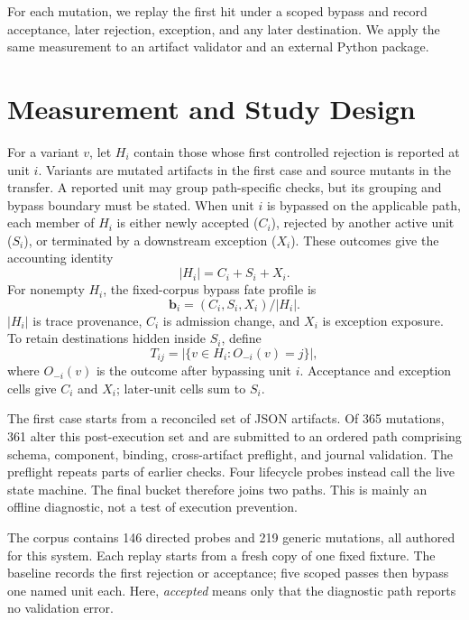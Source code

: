 \documentclass[11pt]{article}
\begin{document}
For each mutation, we replay the first hit under a scoped bypass and record
acceptance, later rejection, exception, and any later destination. We apply the
same measurement to an artifact validator and an external Python package.

\section{Measurement and Study Design}
\label{sec:method}

For a variant $v$, let $H_i$ contain those whose first controlled rejection is
reported at unit $i$. Variants are mutated artifacts in the first case and
source mutants in the transfer. A reported unit may group path-specific checks,
but its grouping and bypass boundary must be stated.
When unit $i$ is bypassed on the applicable path, each member of $H_i$ is either
newly accepted ($C_i$), rejected by another active unit ($S_i$), or terminated
by a downstream exception ($X_i$). These outcomes give the accounting identity
\begin{equation}
  |H_i|=C_i+S_i+X_i.
  \label{eq:partition}
\end{equation}
For nonempty $H_i$, the fixed-corpus bypass fate profile is
\begin{equation}
  \mathbf{b}_i=(C_i,S_i,X_i)/|H_i|.
  \label{eq:profile}
\end{equation}
$|H_i|$ is trace provenance, $C_i$ is admission change, and $X_i$ is exception
exposure. To retain destinations hidden inside $S_i$, define
\begin{equation}
  T_{ij}=|\{v\in H_i:O_{-i}(v)=j\}|,
  \label{eq:transition}
\end{equation}
where $O_{-i}(v)$ is the outcome after bypassing unit $i$. Acceptance and
exception cells give $C_i$ and $X_i$; later-unit cells sum to $S_i$.

The first case starts from a reconciled set of JSON artifacts. Of 365 mutations, 361
alter this post-execution set and are submitted to an ordered path comprising
schema, component, binding, cross-artifact preflight, and journal validation.
The preflight repeats parts of earlier checks. Four lifecycle probes instead
call the live state machine. The
final bucket therefore joins two paths. This is mainly an offline diagnostic, not a
test of execution prevention.

The corpus contains 146 directed probes and 219 generic mutations, all authored
for this system. Each replay starts from a fresh copy of one fixed fixture. The
baseline records the first rejection or acceptance; five scoped passes then
bypass one named unit each. Here, \emph{accepted} means only that the diagnostic
path reports no validation error.
\end{document}
